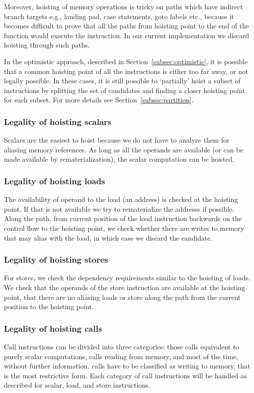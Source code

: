 \documentclass{sig-alternate}
\begin{document}
Moreover, hoisting of memory operations is tricky on paths which have indirect
branch targets e.g., landing pad, case statements, goto labels etc., because it
becomes difficult to prove that all the paths from hoisting point to the end of
the function would execute the instruction. In our current implementation we
discard hoisting through such paths.

In the optimistic approach, described in Section~\ref{subsec:optimistic}, it is
possible that a common hoisting point of all the instructions is either too far
away, or not legally possible. In these cases, it is still possible to
`partially' hoist a subset of instructions by splitting the set of candidates
and finding a closer hoisting point for each subset. For more details see
Section~\ref{subsec:partition}.

\subsubsection{Legality of hoisting scalars}
Scalars are the easiest to hoist because we do not have to analyze them for
aliasing memory references. As long as all the operands are available (or can be
made available by rematerialization), the scalar computation can be hoisted.

\subsubsection{Legality of hoisting loads}
The availability of operand to the load (an address) is checked at the hoisting
point. If that is not available we try to rematerialize the addresss if
possible.  Along the path, from current position of the load instruction
backwards on the control flow to the hoisting point, we check whether there are
writes to memory that may alias with the load, in which case we discard the
candidate.

\subsubsection{Legality of hoisting stores}
For stores, we check the dependency requirements similar to the hoisting of
loads. We check that the operands of the store instruction are available at the
hoisting point, that there are no aliasing loads or store along the path from
the current position to the hoisting point.

\subsubsection{Legality of hoisting calls}
Call instructions can be divided into three categories: those calls equivalent
to purely scalar computations, calls reading from memory, and most of the time,
without further information, calls have to be classified as writing to memory,
that is the most restrictive form.  Each category of call instructions will be
handled as described for scalar, load, and store instructions.
\end{document}
